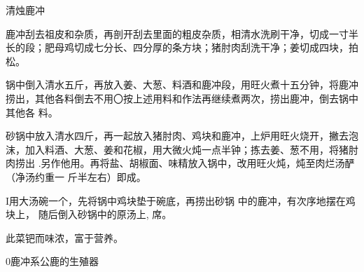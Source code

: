 \begin{recipe}{清烛鹿冲}

\ingredients


\cooking

\step 鹿冲刮去祖皮和杂质，再剖开刮去里面的粗皮杂质，相清水洗刷干净，切成一寸半
长的段；肥母鸡切成七分长、四分厚的条方块；猪肘肉刮洗干净；姜切成四块，拍松。

\step 锅中倒入清水五斤，再放入姜、大葱、料酒和鹿冲段，用旺火煮十五分钟，将鹿冲
捞出，其他各料倒去不用〇按上述用料和作法再继续煮两次，捞出鹿冲，倒去锅中其他各
料。

\step 砂锅中放入清水四斤，再一起放入猪肘肉、鸡块和鹿冲，上炉用旺火烧开，撇去泡
沫，加入料酒、大葱、姜和花椒，用大微火炖一点半钟；拣去姜、葱不用，将猪肘肉捞出
.另作他用。再将盐、胡椒面、味精放入锅中，改用旺火炖，炖至肉烂汤酽（净汤约重一
斤半左右）即成。

I用大汤碗一个，先将锅中鸡块垫于碗底，再捞出砂锅 中的鹿冲，有次序地摆在鸡块上，
随后倒入砂锅中的原汤上, 席。

\notes

此菜钯而味浓，富于营养。

0鹿冲系公鹿的生殖器

\end{recipe}


